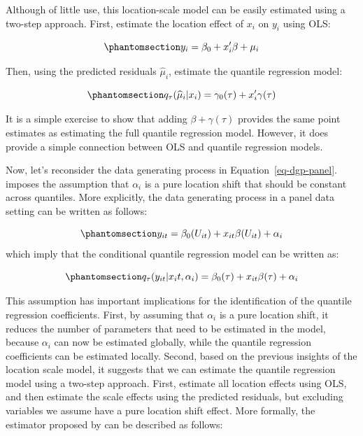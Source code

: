 \documentclass[bib]{statapress}
\begin{document}
Although of little use, this location-scale model can be easily
estimated using a two-step approach. First, estimate the location effect
of \(x_i\) on \(y_i\) using OLS:

\begin{equation}\phantomsection\label{eq-ls-1}{y_i = \beta_0+x_i'\beta + \mu_i
}\end{equation}

Then, using the predicted residuals \(\hat \mu_i\), estimate the
quantile regression model:

\begin{equation}\phantomsection\label{eq-ls-2}{q_\tau(\hat \mu_i|x_i)=\gamma_0(\tau)+ x_i'\gamma(\tau)
}\end{equation}

It is a simple exercise to show that adding \(\beta+\gamma(\tau)\)
provides the same point estimates as estimating the full quantile
regression model. However, it does provide a simple connection between
OLS and quantile regression models.

Now, let's reconsider the data generating process in
Equation~\ref{eq-dgp-panel}. \citet{canay2011} imposes the assumption
that \(\alpha_i\) is a pure location shift that should be constant
across quantiles. More explicitly, the data generating process in a
panel data setting can be written as follows:

\begin{equation}\phantomsection\label{eq-canay-dgp}{y_{it} = \beta_0(U_{it}) + x_{it}\beta(U_{it}) + \alpha_i
}\end{equation} which imply that the conditional quantile regression
model can be written as:

\begin{equation}\phantomsection\label{eq-canay-qreg}{q_\tau(y_{it}|x_it,\alpha_i) = \beta_0(\tau) + x_{it}\beta(\tau) + \alpha_i
}\end{equation}

This assumption has important implications for the identification of the
quantile regression coefficients. First, by assuming that \(\alpha_i\)
is a pure location shift, it reduces the number of parameters that need
to be estimated in the model, because \(\alpha_i\) can now be estimated
globally, while the quantile regression coefficients can be estimated
locally. Second, based on the previous insights of the location scale
model, it suggests that we can estimate the quantile regression model
using a two-step approach. First, estimate all location effects using
OLS, and then estimate the scale effects using the predicted residuals,
but excluding variables we assume have a pure location shift effect.
More formally, the estimator proposed by \citet{canay2011} can be
described as follows:
\end{document}
